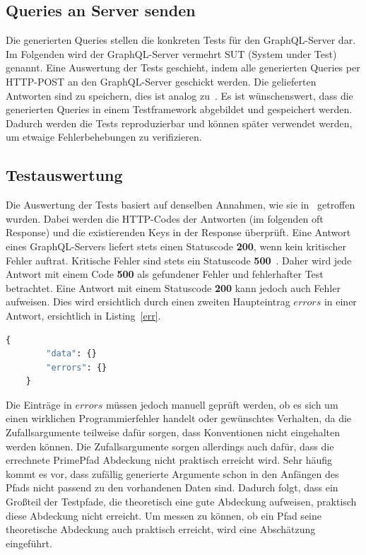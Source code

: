 \subsection{Queries an Server senden}
\label{testf}

Die generierten Queries stellen die konkreten Tests für den GraphQL-Server dar.
Im Folgenden wird der GraphQL-Server vermehrt SUT (System under Test) genannt.
Eine Auswertung der Tests geschieht, indem alle generierten Queries per HTTP-POST an den GraphQL-Server geschickt werden.
Die gelieferten Antworten sind zu speichern, dies ist analog zu~\cite{property-based-testing}.
Es ist wünschenswert, dass die generierten Queries in einem Testframework abgebildet und gespeichert werden.
Dadurch werden die Tests reproduzierbar und können später verwendet werden, um etwaige Fehlerbehebungen zu verifizieren.

\subsection{Testauswertung}

Die Auswertung der Tests basiert auf denselben Annahmen, wie sie in~\cite{property-based-testing} getroffen wurden.
Dabei werden die HTTP-Codes der Antworten (im folgenden oft Response) und die existierenden Keys in der Response überprüft.
Eine Antwort eines GraphQL-Servers liefert stets einen Statuscode \textbf{200}, wenn kein kritischer Fehler auftrat.
Kritische Fehler sind stets ein Statuscode \textbf{500}~\cite[vgl. 7. Response]{graphqlspecification}.
Daher wird jede Antwort mit einem Code \textbf{500} als gefundener Fehler und fehlerhafter Test betrachtet.
Eine Antwort mit einem Statuscode \textbf{200} kann jedoch auch Fehler aufweisen.
Dies wird ersichtlich durch einen zweiten Haupteintrag $errors$ in einer Antwort, ersichtlich in Listing~\ref{err}.

\begin{lstlisting}[language=GraphQL, label={err}, caption={fehlerhafte Antwort}]
    {
        "data": {}
        "errors": {}
    }
\end{lstlisting}

Die Einträge in $errors$ müssen jedoch manuell geprüft werden, ob es sich um einen wirklichen Programmierfehler handelt oder gewünschtes Verhalten,
da die Zufallsargumente teilweise dafür sorgen, dass Konventionen nicht eingehalten werden können.
Die Zufallsargumente sorgen allerdings auch dafür, dass die errechnete PrimePfad Abdeckung nicht praktisch erreicht wird.
Sehr häufig kommt es vor, dass zufällig generierte Argumente schon in den Anfängen des Pfads nicht passend zu den vorhandenen Daten sind.
Dadurch folgt, dass ein Großteil der Testpfade, die theoretisch eine gute Abdeckung aufweisen, praktisch diese Abdeckung nicht erreicht.
Um messen zu können, ob ein Pfad seine theoretische Abdeckung auch praktisch erreicht, wird eine Abschätzung eingeführt.

